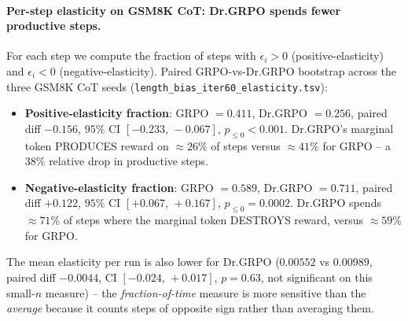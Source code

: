 \documentclass{article}
\begin{document}
\paragraph{Per-step elasticity on GSM8K CoT: Dr.GRPO spends fewer
productive steps.}
For each step we compute the fraction of steps with $\epsilon_i > 0$
(positive-elasticity) and $\epsilon_i < 0$ (negative-elasticity).
Paired GRPO-vs-Dr.GRPO bootstrap across the three GSM8K CoT seeds
(\texttt{length\_bias\_iter60\_elasticity.tsv}):
\begin{itemize}
\item \textbf{Positive-elasticity fraction}:
      GRPO $= 0.411$, Dr.GRPO $= 0.256$,
      paired diff $-0.156$, $95\%$ CI $[-0.233,\, -0.067]$,
      $p_{\le 0} < 0.001$. Dr.GRPO's marginal token PRODUCES reward
      on $\approx 26\%$ of steps versus $\approx 41\%$ for GRPO -- a
      $38\%$ relative drop in productive steps.
\item \textbf{Negative-elasticity fraction}:
      GRPO $= 0.589$, Dr.GRPO $= 0.711$,
      paired diff $+0.122$, $95\%$ CI $[+0.067,\, +0.167]$,
      $p_{\le 0} = 0.0002$. Dr.GRPO spends $\approx 71\%$ of steps
      where the marginal token DESTROYS reward, versus $\approx 59\%$
      for GRPO.
\end{itemize}
The mean elasticity per run is also lower for Dr.GRPO
($0.00552$ vs $0.00989$, paired diff $-0.0044$, CI $[-0.024,\, +0.017]$,
$p = 0.63$, not significant on this small-$n$ measure) -- the
\emph{fraction-of-time} measure is more sensitive than the \emph{average}
because it counts steps of opposite sign rather than averaging them.
\end{document}
